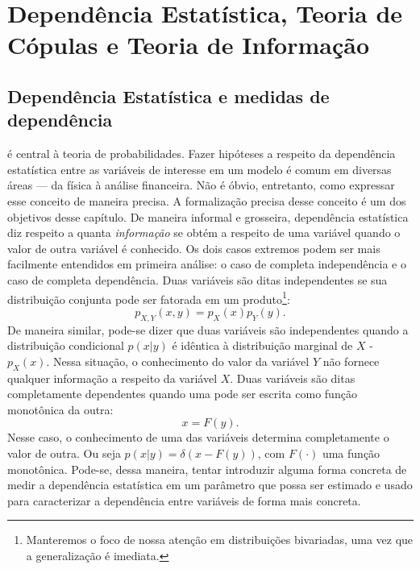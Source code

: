 \chapter{Dependência Estatística, Teoria de Cópulas e Teoria de Informação}
\section{Dependência Estatística e medidas de dependência}


 é central à teoria de probabilidades. Fazer hipóteses a respeito da dependência estatística entre as variáveis de interesse em um modelo é comum em diversas áreas --- da física à análise financeira. Não é óbvio, entretanto, como expressar esse conceito de maneira precisa. A formalização precisa desse conceito é um dos objetivos desse capítulo. De maneira informal e grosseira, dependência estatística diz respeito a quanta \textit{informação} se obtém a respeito de uma variável quando o valor de outra variável é conhecido. Os dois casos extremos podem ser mais facilmente entendidos em primeira análise: o caso de completa independência e o caso de completa dependência. Duas variáveis são ditas independentes se sua distribuição conjunta pode ser fatorada em um produto\footnote{Manteremos o foco de nossa atenção em distribuições bivariadas, uma vez que a generalização é imediata.}:
\begin{equation}
\label{eq:independence}
 p_{X,Y}(x,y) = p_{X}(x)p_{Y}(y).
\end{equation}
De maneira similar, pode-se dizer que duas variáveis são independentes quando a distribuição condicional $p(x|y)$ é idêntica à distribuição marginal de $X$ - $p_{X}(x)$. Nessa situação, o conhecimento do valor da variável $Y$ não fornece qualquer informação a respeito da variável $X$. Duas variáveis são ditas completamente dependentes quando uma pode ser escrita como função monotônica da outra:
\begin{equation}
x = F(y).
\end{equation}
Nesse caso, o conhecimento de uma das variáveis determina completamente o valor de outra. Ou seja $p(x | y)  = \delta(x - F(y))$, com $F(\cdot)$ uma função monotônica. Pode-se, dessa maneira, tentar introduzir alguma forma concreta de medir a dependência estatística em um parâmetro que possa ser estimado e usado para caracterizar a dependência entre variáveis de forma mais concreta.

